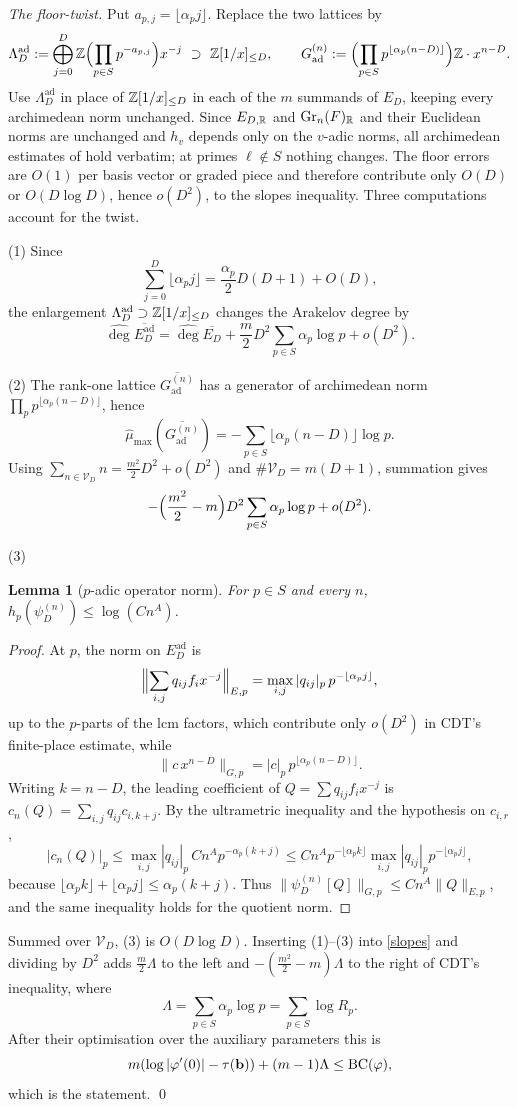 \documentclass[11pt]{amsart}
\newtheorem{lemma}[theorem]{Lemma}
\theoremstyle{remark}
\newcommand{\adeg}{\widehat{\deg}}\newcommand{\amu}{\widehat{\mu}_{\max}}
\begin{document}
\emph{The floor-twist.} Put $a_{p,j}=\lfloor\alpha_pj\rfloor$. Replace the two lattices by
\[
\Lambda_D^{\mathrm{ad}}
 :=\bigoplus_{j=0}^D\mathbb Z\Bigl(\prod_{p\in S}p^{-a_{p,j}}\Bigr)x^{-j}
 \ \supset\ \mathbb Z[1/x]_{\le D},
\qquad
G^{(n)}_{\mathrm{ad}}
 :=\Bigl(\prod_{p\in S}p^{\lfloor\alpha_p(n-D)\rfloor}\Bigr)\mathbb Z\cdot x^{n-D}.
\]
Use $\Lambda_D^{\mathrm{ad}}$ in place of $\mathbb Z[1/x]_{\le D}$ in each of the $m$ summands of $E_D$, keeping every archimedean norm unchanged. Since $E_{D,\mathbb R}$ and $\mathrm{Gr}_n(F)_\mathbb R$ and their Euclidean norms are unchanged and $h_v$ depends only on the $v$-adic norms, all archimedean estimates of \cite{CDTl2chi} hold verbatim; at primes $\ell\notin S$ nothing changes. The floor errors are $O(1)$ per basis vector or graded piece and therefore contribute only $O(D)$ or $O(D\log D)$, hence $o(D^2)$, to the slopes inequality. Three computations account for the twist.

(1) Since
\[\sum_{j=0}^D\lfloor\alpha_pj\rfloor=\frac{\alpha_p}{2}D(D+1)+O(D),\]
the enlargement $\Lambda_D^{\mathrm{ad}}\supset\mathbb Z[1/x]_{\le D}$ changes the Arakelov degree by
\[\adeg\overline{E^{\mathrm{ad}}_D}=\adeg\overline{E_D}+\frac m2D^2\sum_{p\in S}\alpha_p\log p+o(D^2).
\]

(2) The rank-one lattice $\overline{G^{(n)}_{\mathrm{ad}}}$ has a generator of archimedean norm $\prod_p p^{\lfloor\alpha_p(n-D)\rfloor}$, hence
\[\amu(\overline{G^{(n)}_{\mathrm{ad}}})=-\sum_{p\in S}\lfloor\alpha_p(n-D)\rfloor\log p.
\]
Using $\sum_{n\in\mathcal V_D}n=\tfrac{m^2}{2}D^2+o(D^2)$ and $\#\mathcal V_D=m(D+1)$, summation gives
\[-\Bigl(\frac{m^2}{2}-m\Bigr)D^2\sum_{p\in S}\alpha_p\log p+o(D^2).
\]

(3) \begin{lemma}[$p$-adic operator norm]\label{opnorm} For $p\in S$ and every $n$, $h_p(\psi^{(n)}_D)\le\log(Cn^A)$.
\end{lemma}
\begin{proof}
At $p$, the norm on $E^{\mathrm{ad}}_D$ is
\[\Bigl\|\sum_{i,j}q_{ij}f_ix^{-j}\Bigr\|_{E,p}
 =\max_{i,j}|q_{ij}|_p\,p^{-\lfloor\alpha_pj\rfloor},
\]
up to the $p$-parts of the lcm factors, which contribute only $o(D^2)$ in CDT's finite-place estimate, while
\[\|c\,x^{n-D}\|_{G,p}=|c|_p\,p^{\lfloor\alpha_p(n-D)\rfloor}.
\]
Writing $k=n-D$, the leading coefficient of $Q=\sum q_{ij}f_ix^{-j}$ is
$c_n(Q)=\sum_{i,j}q_{ij}c_{i,k+j}$. By the ultrametric inequality and the hypothesis on $c_{i,r}$,
\[
|c_n(Q)|_p
 \le \max_{i,j}|q_{ij}|_p\,Cn^A p^{-\alpha_p(k+j)}
 \le Cn^A p^{-\lfloor\alpha_pk\rfloor}
       \max_{i,j}|q_{ij}|_p p^{-\lfloor\alpha_pj\rfloor},
\]
because $\lfloor\alpha_pk\rfloor+\lfloor\alpha_pj\rfloor\le\alpha_p(k+j)$. Thus
$\|\psi^{(n)}_D[Q]\|_{G,p}\le Cn^A\|Q\|_{E,p}$, and the same inequality holds for the quotient norm.
\end{proof}
Summed over $\mathcal V_D$, (3) is $O(D\log D)$. Inserting (1)--(3) into \eqref{slopes} and dividing by $D^2$ adds $\tfrac m2\Lambda$ to the left and $-(\tfrac{m^2}2-m)\Lambda$ to the right of CDT's inequality, where
\[\Lambda=\sum_{p\in S}\alpha_p\log p=\sum_{p\in S}\log R_p.
\]
After their optimisation over the auxiliary parameters this is
\[m(\log|\varphi'(0)|-\tau(\mathbf b))+(m-1)\Lambda\le\mathrm{BC}(\varphi),\]
which is the statement. \qed
\end{document}
